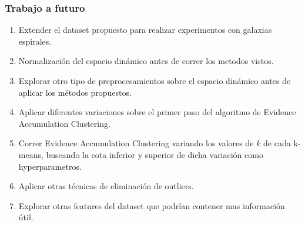 \begin{frame}
\frametitle{Trabajo a futuro}

\begin{enumerate}
    \item<1-> Extender el dataset propuesto para realizar experimentos con galaxias espirales.
    \item<2-> Normalización del espacio dinámico antes de correr los metodos vistos.
    \item<3-> Explorar otro tipo de preprocesamientos sobre el espacio dinámico antes de aplicar los métodos propuestos.
    \item<4-> Aplicar diferentes variaciones sobre el primer paso del algoritmo de Evidence Accumulation Clustering.
    \item<5-> Correr Evidence Accumulation Clustering variando los valores de $k$ de cada k-means, buscando la cota inferior y superior de dicha variación como hyperparametros.
    \item<6-> Aplicar otras técnicas de eliminación de outliers.
    \item<7-> Explorar otras features del dataset que podrían contener mas información útil.
\end{enumerate}


\end{frame}


